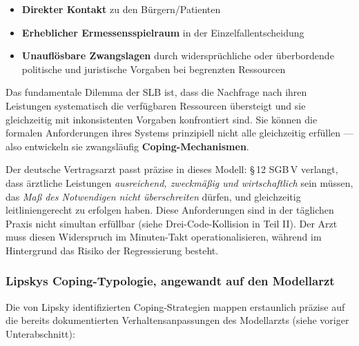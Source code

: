 \documentclass{umbruch-position}
\begin{document}
\begin{itemize}[nosep]
  \item \textbf{Direkter Kontakt} zu den Bürgern/Patienten
  \item \textbf{Erheblicher Ermessensspielraum} in der Einzelfallentscheidung
  \item \textbf{Unauflösbare Zwangslagen} durch widersprüchliche oder überbordende politische und juristische Vorgaben bei begrenzten Ressourcen
\end{itemize}

Das fundamentale Dilemma der SLB ist, dass die Nachfrage nach ihren Leistungen systematisch die verfügbaren Ressourcen übersteigt und sie gleichzeitig mit inkonsistenten Vorgaben konfrontiert sind. Sie können die formalen Anforderungen ihres Systems prinzipiell nicht alle gleichzeitig erfüllen --- also entwickeln sie zwangsläufig \textbf{Coping-Mechanismen}.

Der deutsche Vertragsarzt passt präzise in dieses Modell: \S\,12 SGB\,V verlangt, dass ärztliche Leistungen \textit{ausreichend, zweckmäßig und wirtschaftlich} sein müssen, das \textit{Maß des Notwendigen nicht überschreiten} dürfen, und gleichzeitig leitliniengerecht zu erfolgen haben. Diese Anforderungen sind in der täglichen Praxis nicht simultan erfüllbar (siehe Drei-Code-Kollision in Teil II). Der Arzt muss diesen Widerspruch im Minuten-Takt operationalisieren, während im Hintergrund das Risiko der Regressierung besteht.

\subsubsection{Lipskys Coping-Typologie, angewandt auf den Modellarzt}

Die von Lipsky identifizierten Coping-Strategien mappen erstaunlich präzise auf die bereits dokumentierten Verhaltensanpassungen des Modellarzts (siehe voriger Unterabschnitt):
\end{document}
